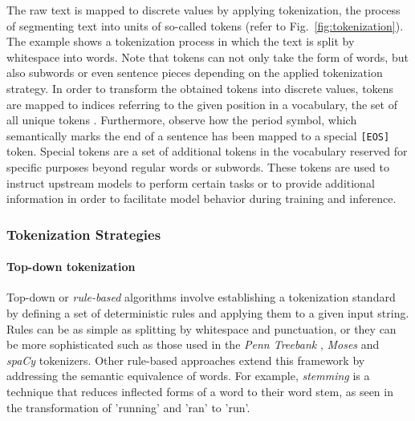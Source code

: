 The raw text is mapped to discrete values by applying tokenization, the process
of segmenting text into units of so-called tokens (refer to
Fig.~\ref{fig:tokenization}). The example shows a tokenization process in which
the text is split by whitespace into words. Note that tokens can not only take
the form of words, but also subwords or even sentence pieces depending on the
applied tokenization strategy. In order to transform the obtained tokens into
discrete values, tokens are mapped to indices referring to the given position in
a vocabulary, the set of all unique tokens \cite{mielke2021between}.
Furthermore, observe how the period symbol, which semantically marks the end of
a sentence has been mapped to a special \texttt{[EOS]} token. Special tokens are
a set of additional tokens in the vocabulary reserved for specific purposes
beyond regular words or subwords. These tokens are used to instruct upstream
models to perform certain tasks or to provide additional information in order to
facilitate model behavior during training and inference.

\subsubsection{Tokenization Strategies}

\paragraph{Top-down tokenization} Top-down or \textit{rule-based} algorithms
involve establishing a tokenization standard by defining a set of deterministic
rules and applying them to a given input string. Rules can be as simple as
splitting by whitespace and punctuation, or they can be more sophisticated such
as those used in the \textit{Penn Treebank} \cite{marcus1993building},
\textit{Moses} \cite{koehn2007moses} and \textit{spaCy} \cite{honnibal2017spacy}
tokenizers. Other rule-based approaches extend this framework by addressing the
semantic equivalence of words. For example, \textit{stemming} is a technique
that reduces inflected forms of a word to their word stem, as seen in the
transformation of 'running' and 'ran' to 'run'. 

